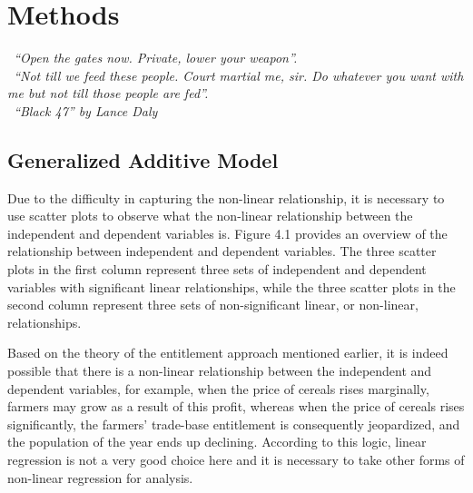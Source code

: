 \chapter{Methods}


\textit{\textendash\ ``Open the gates now. Private, lower your weapon''. \\ 
\textendash\ ``Not till we feed these people. Court martial me, sir. Do whatever you want with me but not till those people are fed''.\\
\textemdash\ ``Black 47'' by Lance Daly}	
	
\section{Generalized Additive Model}

Due to the difficulty in capturing the non-linear relationship, it is necessary to use scatter plots to observe what the non-linear relationship between the independent and dependent variables is. Figure 4.1 provides an overview of the relationship between independent and dependent variables. The three scatter plots in the first column represent three sets of independent and dependent variables with significant linear relationships, while the three scatter plots in the second column represent three sets of non-significant linear, or non-linear, relationships.

Based on the theory of the entitlement approach mentioned earlier, it is indeed possible that there is a non-linear relationship between the independent and dependent variables, for example, when the price of cereals rises marginally, farmers may grow as a result of this profit, whereas when the price of cereals rises significantly, the farmers' trade-base entitlement is consequently jeopardized, and the population of the year ends up declining. According to this logic, linear regression is not a very good choice here and it is necessary to take other forms of non-linear regression for analysis.

